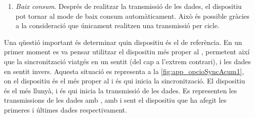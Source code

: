 \documentclass{tfgitic}[2024/07/01]
\begin{document}
{\begin{enumerate}
    Aquest mecanisme és important, ja que evita perdre les dades de tots els dispositius si un falla. A més, afegeix un mecanisme de detecció d'errors: si existeixen 10 dispositius però només rebem 5 valors de dades, podem assegurar que, com a mínim, hi ha hagut un error en la transmissió entre els dispositius 6 i 5. Si no hi hagués hagut aquest error, el dispositiu 5 hauria rebut les dades del dispositiu 6, hi hauria afegit les seves i, per tant, hauríem rebut com a mínim 6 valors de dades.
    \item \emph{Baix consum}. Després de realitzar la transmissió de les dades, el dispositiu pot tornar al mode de baix consum automàticament. Això és possible gràcies a la consideració que únicament realitzen una transmissió per cicle.
\end{enumerate}


Una qüestió important és determinar quin dispositiu és el de referència. En un primer moment es va pensar utilitzar el dispositiu més proper al , permetent així que la sincronització viatgés en un sentit (del  cap a l'extrem contrari), i les dades en sentit invers. Aquesta situació es representa a la \autoref{fig:app_opcioSyncAcum1}, on el dispositiu  és el més proper al  i és qui inicia la sincronització. El dispositiu  és el més llunyà, i és qui inicia la transmissió de les dades. Es representen les transmissions de les dades amb  , amb  i  sent el dispositiu que ha afegit les primeres i últimes dades respectivament.  

}
\end{document}
